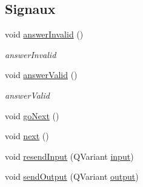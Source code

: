 \subsection*{Signaux}
\begin{DoxyCompactItemize}
\item 
void \hyperlink{classSH__QuestionState_a3348a8a683130678ac87a10ba2a25486}{answer\-Invalid} ()
\begin{DoxyCompactList}\small\item\em answer\-Invalid \end{DoxyCompactList}\item 
void \hyperlink{classSH__QuestionState_a04e259643788d15ab6244bc8a04286d6}{answer\-Valid} ()
\begin{DoxyCompactList}\small\item\em answer\-Valid \end{DoxyCompactList}\item 
void \hyperlink{classSH__GenericState_a34c1bebc765cc3a62d66c94c37d4f0c3}{go\-Next} ()
\item 
void \hyperlink{classSH__GenericState_ad5e2a1f3dc129336c8f529cf897c2eb0}{next} ()
\item 
void \hyperlink{classSH__InOutState_a1f00480afefd173002cf56d4c4128048}{resend\-Input} (Q\-Variant \hyperlink{classSH__InOutState_a8e1b78069343122df7713624a1a5a100}{input})
\item 
void \hyperlink{classSH__InOutState_a77921c5f42059bc97361f4ff7827da12}{send\-Output} (Q\-Variant \hyperlink{classSH__InOutState_a17ed7eaf5e3ed5af80a4f9fe65d5bfd9}{output})
\end{DoxyCompactItemize}
